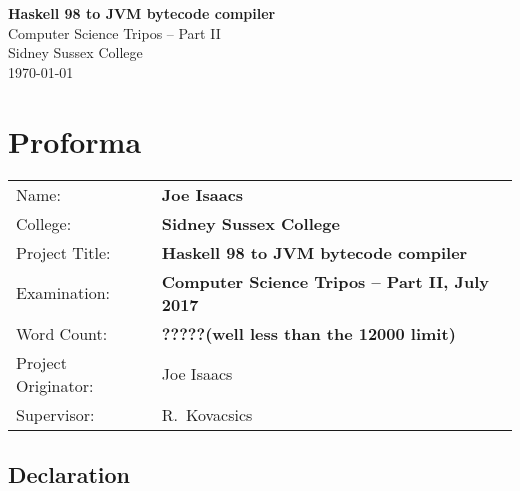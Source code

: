 \documentclass[12pt,a4paper,twoside,openright]{book}
\numberwithin{subcase}{case}
\begin{document}

\thispagestyle{empty}

\pagestyle{empty}
\begingroup


\vspace*{60mm}
\begin{center}
\Huge
\textbf{Haskell 98 to JVM bytecode compiler} \\[5mm]
Computer Science Tripos -- Part II \\[5mm]
Sidney Sussex College \\[5mm]
\today  %
\end{center}


\newpage

\thispagestyle{empty}


\pagestyle{plain}

\frontmatter

\chapter*{Proforma}

{\large
\begin{tabular}{ll}
Name:               & \bf Joe Isaacs                            \\
College:            & \bf Sidney Sussex College                 \\
Project Title:      & \bf Haskell 98 to JVM bytecode compiler   \\
Examination:        & \bf Computer Science Tripos -- Part II, July 2017  \\
Word Count:         & \bf ?????\footnotemark[1]
                    (well less than the 12000 limit)  \\
Project Originator: & Joe Isaacs                      \\
Supervisor:         & R.~Kovacsics                    \\ 
\end{tabular}
}


\section*{Declaration}
\end{document}
